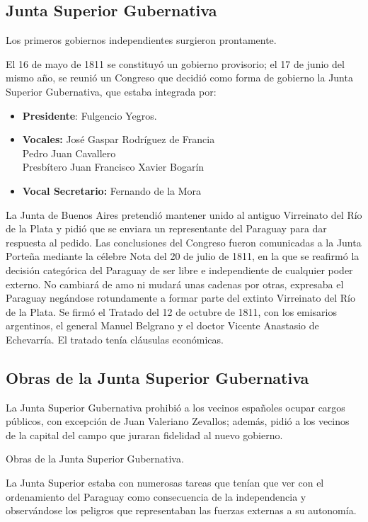 \documentclass{article}
\begin{document}
  \subsection*{Junta Superior Gubernativa}
  Los primeros gobiernos independientes surgieron prontamente.

El 16 de mayo de 1811 se constituyó un gobierno provisorio; el 17 de 
junio del mismo año, se reunió un Congreso que decidió como forma de gobierno
la Junta Superior Gubernativa, que estaba integrada por:

  \begin{itemize}
    \item \textbf{Presidente}: Fulgencio Yegros.
    \item \textbf{Vocales:} \hfill
      José Gaspar Rodríguez de Francia\\
      Pedro Juan Cavallero\\
      Presbítero Juan Francisco Xavier Bogarín\\
    \item \textbf{Vocal Secretario:} Fernando de la Mora
  \end{itemize}

La Junta de Buenos Aires pretendió mantener unido al antiguo Virreinato del
Río de la Plata y pidió que se enviara un representante del Paraguay para dar
respuesta al pedido. Las conclusiones del Congreso fueron comunicadas a la Junta 
Porteña mediante la célebre Nota del 20 de julio de 1811, en la que se reafirmó
la decisión categórica del Paraguay de ser libre e independiente de cualquier
poder externo. No cambiará de amo ni mudará unas cadenas por otras, expresaba 
el Paraguay negándose rotundamente a formar parte del extinto Virreinato del Río
de la Plata. Se firmó el Tratado del 12 de octubre de 1811, con los emisarios
argentinos, el general Manuel Belgrano y el doctor Vicente Anastasio de Echevarría.
El tratado tenía cláusulas económicas.

  \subsection*{Obras de la Junta Superior Gubernativa}
  La Junta Superior Gubernativa prohibió a los vecinos españoles ocupar cargos
públicos, con excepción de Juan Valeriano Zevallos; además, pidió a los vecinos 
de la capital del campo que juraran fidelidad al nuevo gobierno.

Obras de la Junta Superior Gubernativa.

La Junta Superior estaba con numerosas tareas que tenían que ver con el ordenamiento
del Paraguay como consecuencia de la independencia y observándose los peligros que 
representaban las fuerzas externas a su autonomía.
\end{document}
